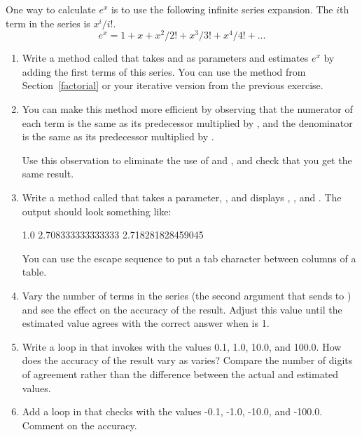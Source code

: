 \begin{exercise}  %


One way to calculate $e^x$ is to use the following infinite series expansion.
The $i$th term in the series is $x^i / i!$.
%
\[ e^x = 1 + x + x^2 / 2! + x^3 / 3! + x^4 / 4! + \ldots \]
%
\begin{enumerate}

\item Write a method called  that takes  and  as parameters and estimates $e^x$ by adding the first  terms of this series.
You can use the  method from Section~\ref{factorial} or your iterative version from the previous exercise.


\item You can make this method more efficient by observing that the numerator of each term is the same as its predecessor multiplied by , and the denominator is the same as its predecessor multiplied by .

Use this observation to eliminate the use of  and , and check that you get the same result.

\item Write a method called  that takes a parameter, , and displays , , and .
The output should look something like:

\begin{stdout}
1.0     2.708333333333333     2.718281828459045
\end{stdout}

You can use the escape sequence  to put a tab character between columns of a table.

\item Vary the number of terms in the series (the second argument that  sends to ) and see the effect on the accuracy of the result.
Adjust this value until the estimated value agrees with the correct answer when  is 1.

\item Write a loop in  that invokes  with the values 0.1, 1.0, 10.0, and 100.0.
How does the accuracy of the result vary as  varies?
Compare the number of digits of agreement rather than the difference between the actual and estimated values.

\item Add a loop in  that checks  with the values -0.1, -1.0, -10.0, and -100.0.
Comment on the accuracy.

\end{enumerate}

\end{exercise}



